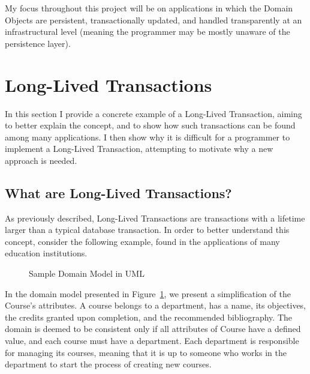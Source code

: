 \documentclass{llncs}
\begin{document}
My focus throughout this project will be on applications in which the
Domain Objects are persistent, transactionally updated, and handled
transparently at an infrastructural level (meaning the programmer may
be mostly unaware of the persistence layer).

\section{Long-Lived Transactions}

In this section I provide a concrete example of a Long-Lived
Transaction, aiming to better explain the concept, and to show how
such transactions can be found among many applications. I then show
why it is difficult for a programmer to implement a Long-Lived
Transaction, attempting to motivate why a new approach is needed.

\subsection{What are Long-Lived Transactions?}
\label{sec:what}

As previously described, Long-Lived Transactions are transactions with
a lifetime larger than a typical database transaction. In order to
better understand this concept, consider the following example, found
in the applications of many education institutions.

\begin{figure}
  \centering

\caption{Sample Domain Model in UML}
\label{fig:courseDomain}

\end{figure}

In the domain model presented in Figure~\ref{fig:courseDomain}, we
present a simplification of the Course's attributes. A course belongs
to a department, has a name, its objectives, the credits granted upon
completion, and the recommended bibliography. The domain is deemed to
be consistent only if all attributes of Course have a defined value,
and each course must have a department. Each department is responsible
for managing its courses, meaning that it is up to someone who works
in the department to start the process of creating new courses.
\end{document}
